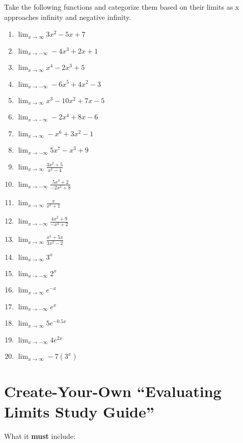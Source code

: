 \documentclass{article}
\begin{document}
Take the following functions and categorize them based on their limits as x approaches infinity and negative infinity.

\begin{enumerate}
\item $\displaystyle \lim_{x \to \infty} 3x^2 - 5x + 7$
\item $\displaystyle \lim_{x \to -\infty} -4x^3 + 2x + 1$
\item $\displaystyle \lim_{x \to \infty} x^4 - 2x^3 + 5$
\item $\displaystyle \lim_{x \to -\infty} -6x^5 + 4x^2 - 3$
\item $\displaystyle \lim_{x \to \infty} x^3 - 10x^2 + 7x - 5$
\item $\displaystyle \lim_{x \to -\infty} -2x^4 + 8x - 6$
\item $\displaystyle \lim_{x \to \infty} -x^6 + 3x^2 - 1$
\item $\displaystyle \lim_{x \to -\infty} 5x^7 - x^3 + 9$
\item $\displaystyle \lim_{x \to \infty} \frac{3x^2+5}{x^2-4}$
\item $\displaystyle \lim_{x \to -\infty} \frac{5x^3+2}{-2x^2+8}$
\item $\displaystyle \lim_{x \to \infty} \frac{x}{x^2+1}$
\item $\displaystyle \lim_{x \to -\infty} \frac{4x^2+9}{-x^3+2}$
\item $\displaystyle \lim_{x \to \infty} \frac{x^2+5x}{3x^2-2}$
\item $\displaystyle \lim_{x \to \infty} 3^x$
\item $\displaystyle \lim_{x \to -\infty} 2^x$
\item $\displaystyle \lim_{x \to \infty} e^{-x}$
\item $\displaystyle \lim_{x \to -\infty} e^x$
\item $\displaystyle \lim_{x \to \infty} 5e^{-0.5x}$
\item $\displaystyle \lim_{x \to -\infty} 4e^{2x}$
\item $\displaystyle \lim_{x \to \infty} -7(3^x)$
\end{enumerate}

\section*{Create-Your-Own ``Evaluating Limits Study Guide''}

What it \textbf{must} include:
\end{document}
